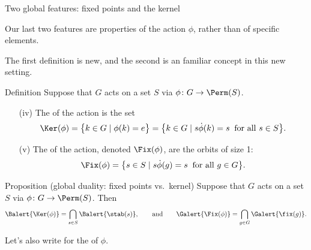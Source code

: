 \documentclass[8pt, handout]{beamer}
\newcommand{\Pause}{}      %
\begin{document}
\begin{frame}{Two global features: fixed points and the kernel} 

  Our last two features are properties of the action $\phi$, rather than of
  specific elements.
  
  \medskip\Pause
  
  The first definition is new, and the second is an familiar concept
  in this new setting. \Pause
  
  \begin{block}{Definition}
    Suppose that $G$ acts on a set $S$ via $\phi\colon G\to\Perm(S)$.  \Pause
    \begin{enumerate}[(i)]
    \item[(iv)] The  of the action is the set
      \[
      \Ker(\phi)=\big\{k\in G\mid\phi(k)=e\big\}=\big\{k\in G\mid s\Dot\phi(k)
      =s\;\;\text{for all } s\in S\big\}. \Pause
      \]
      \vspace{-3mm}
    \item[(v)] The  of the action, denoted
      $\Fix(\phi)$, are the orbits of size 1:
      \[
      \Fix(\phi)=\big\{s\in S\mid s\Dot\phi(g)
      =s\;\;\text{for all } g\in G\big\}.
      \]
    \end{enumerate}
  \end{block}
  
  \vspace{-1mm}\Pause
  
  \begin{block}{Proposition (global duality: fixed points vs.\ kernel)}
    Suppose that $G$ acts on a set $S$ via $\phi\colon G\to\Perm(S)$. \Pause
    Then
    \[
    \Balert{\Ker(\phi)}=\bigcap_{s\in
      S}\Balert{\stab(s)},\Pause\qquad\text{and}\qquad
    \Galert{\Fix(\phi)}=\bigcap_{g\in G}\Galert{\fix(g)}.
    \]
    \vspace{-2mm}
  \end{block}
  
  \smallskip\Pause
  
  Let's also write \Alert{$\Orb(\phi)$} for the 
  of $\phi$.

\end{frame}

\end{document}
